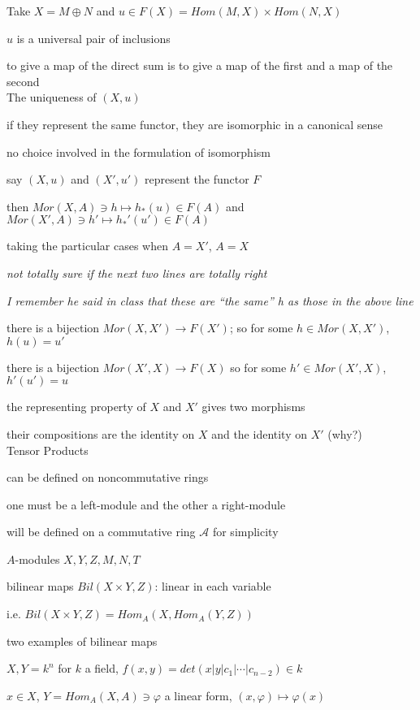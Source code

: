 \documentclass[12pt]{article}
\begin{document}
Take $X = M \oplus N$ and $u \in F(X) = Hom(M, X) \times Hom(N, X)$

$u$ is a universal pair of inclusions

to give a map of the direct sum is to give a map of the first and a map of the second\\

\noindent
The uniqueness of $(X, u)$

if they represent the same functor, they are isomorphic in a canonical sense

no choice involved in the formulation of isomorphism

say $(X, u)$ and $(X', u')$ represent the functor $F$

then $Mor(X, A) \ni h \mapsto h_*(u) \in F(A)$ and $Mor(X', A) \ni h' \mapsto h_*'(u') \in F(A)$

taking the particular cases when $A = X'$, $A = X$

\textit{not totally sure if the next two lines are totally right}

\textit{I remember he said in class that these are ``the same'' h as those in the above line}

there is a bijection $Mor(X, X') \to F(X')$; so for some $h \in Mor(X, X')$, $h(u) = u'$

there is a bijection $Mor(X', X) \to F(X)$ so for some $h' \in Mor(X', X)$, $h'(u') = u$

the representing property of $X$ and $X'$ gives two morphisms

their compositions are the identity on $X$ and the identity on $X'$ (why?)\\

\noindent
Tensor Products

can be defined on noncommutative rings

one must be a left-module and the other a right-module

will be defined on a commutative ring $\mathcal{A}$ for simplicity

$A$-modules $X, Y, Z, M, N, T$

bilinear maps $Bil(X \times Y, Z)$: linear in each variable

i.e. $Bil(X \times Y, Z) = Hom_A(X, Hom_A(Y, Z))$

\noindent
two examples of bilinear maps

$X, Y = k^n$ for $k$ a field, $f(x, y) = det(x | y | c_1 | \cdots | c_{n - 2}) \in k$

$x \in X$, $Y = Hom_A(X, A) \ni \varphi$ a linear form, $(x, \varphi) \mapsto \varphi(x)$\\
\end{document}
